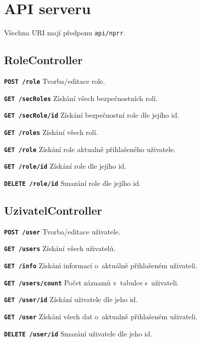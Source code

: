 \chapter{API serveru}
\label{prilohaApi}

Všechna URI mají předponu \texttt{api/nprr}.

\section{RoleController}
\begin{DESCRIPTION}
    \item \texttt{\textbf{POST /role}} Tvorba/editace role.
    \item \texttt{\textbf{GET /secRoles}} Získání všech bezpečnostních rolí.
    \item \texttt{\textbf{GET /secRole/{id}}} Získání bezpečnostní role dle jejího id.
    \item \texttt{\textbf{GET /roles}} Získání všech rolí.
     \item \texttt{\textbf{GET /role}} Získání role aktualně přihlašeného uživatele.
    \item \texttt{\textbf{GET /role/{id}}} Získání role dle jejího id.
    \item \texttt{\textbf{DELETE /role/{id}}} Smazání role dle jejího id.
\end{DESCRIPTION}

\section{UzivatelController}
\begin{DESCRIPTION}
\item \texttt{\textbf{POST /user}} Tvorba/editace uživatele.
\item \texttt{\textbf{GET /users}} Získání všech uživatelů.
\item \texttt{\textbf{GET /info}} Získání informací o~aktuálně přihlašeném uživateli.
\item \texttt{\textbf{GET /users/count}} Počet záznamů v~tabulce s~uživateli.
\item \texttt{\textbf{GET /user/{id}}} Získání uživatele dle jeho id.
\item \texttt{\textbf{GET /user}} Získání všech dat o~aktualně přihlašeném uživateli.
\item \texttt{\textbf{DELETE /user/{id}}} Smazání uživatele dle jeho id.
\end{DESCRIPTION}


